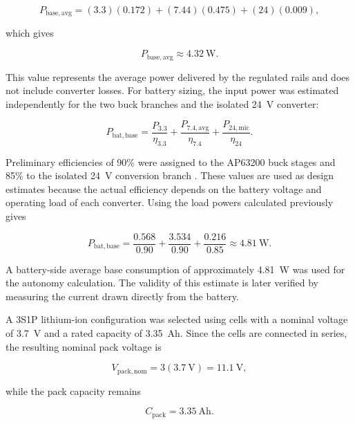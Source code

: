 \begin{equation}
P_{\mathrm{base,avg}}
=
(3.3)(0.172)
+
(7.44)(0.475)
+
(24)(0.009),
\end{equation}

which gives

\begin{equation}
P_{\mathrm{base,avg}}
\approx
4.32~\mathrm{W}.
\end{equation}

This value represents the average power delivered by the regulated rails and does not include converter losses. For battery sizing, the input power was estimated independently for the two buck branches and the isolated 24~V converter:

\begin{equation}
P_{\mathrm{bat,base}}
=
\frac{P_{3.3}}{\eta_{3.3}}
+
\frac{P_{7.4,\mathrm{avg}}}{\eta_{7.4}}
+
\frac{P_{24,\mathrm{mic}}}{\eta_{24}}.
\label{eq:battery_base_power}
\end{equation}

Preliminary efficiencies of 90\% were assigned to the AP63200 buck stages and 85\% to the isolated 24~V conversion branch \cite{AP63,TracoTHN30WIR}. These values are used as design estimates because the actual efficiency depends on the battery voltage and operating load of each converter. Using the load powers calculated previously gives

\begin{equation}
P_{\mathrm{bat,base}}
=
\frac{0.568}{0.90}
+
\frac{3.534}{0.90}
+
\frac{0.216}{0.85}
\approx
4.81~\mathrm{W}.
\end{equation}

A battery-side average base consumption of approximately 4.81~W was used for the autonomy calculation. The validity of this estimate is later verified by measuring the current drawn directly from the battery.

A 3S1P lithium-ion configuration was selected using cells with a nominal voltage of 3.7~V and a rated capacity of 3.35~Ah. Since the cells are connected in series, the resulting nominal pack voltage is

\begin{equation}
V_{\mathrm{pack,nom}}
=
3(3.7~\mathrm{V})
=
11.1~\mathrm{V},
\end{equation}

while the pack capacity remains

\begin{equation}
C_{\mathrm{pack}}
=
3.35~\mathrm{Ah}.
\end{equation}

